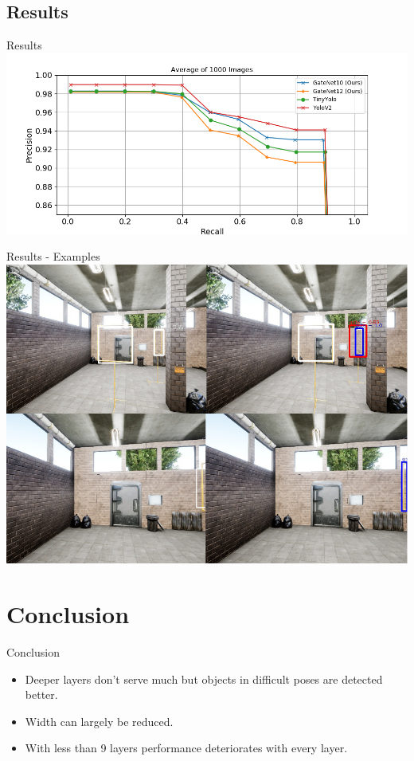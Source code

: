 \documentclass{beamer}
\begin{document}
\begin{darkframes}
    \subsection{Results}
    \begin{frame}{Results}
    	\includegraphics[width=\textwidth]{fig/pr}
    \end{frame}

    \begin{frame}{Results - Examples}
    	\includegraphics[width=\textwidth]{fig/examples}
	\end{frame}
    
    \section{Conclusion}
    \begin{frame}{Conclusion}

    \begin{itemize}
    	\item Deeper layers don't serve much but objects in difficult poses are detected better.
    	\item Width can largely be reduced.
    	\item With less than 9 layers performance deteriorates with every layer.
    \end{itemize}
    \end{frame}


\end{darkframes}
\end{document}
